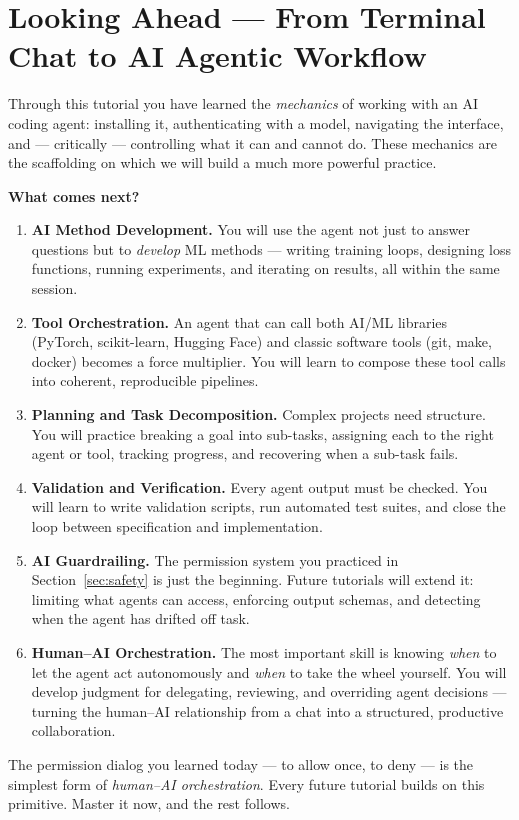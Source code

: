 \documentclass[11pt]{article}
\newcommand{\key}[1]{\keystroke{#1}}
\newcommand{\keystroke}[1]{%
  \tikz[baseline=(key.base)]{%
    \node[draw, rounded corners=2pt, inner sep=2pt, fill=gray!10,
          font=\ttfamily\small] (key) {#1};%
  }%
}
\begin{document}
\section{Looking Ahead --- From Terminal Chat to AI Agentic Workflow}
\label{sec:outlook}

\begin{def-box}
Through this tutorial you have learned the \emph{mechanics} of working with an AI coding agent: installing it, authenticating with a model, navigating the interface, and --- critically --- controlling what it can and cannot do.  These mechanics are the scaffolding on which we will build a much more powerful practice.

\medskip
\noindent\textbf{What comes next?}

\begin{enumerate}[nosep]
  \item \textbf{AI Method Development.}  You will use the agent not just to answer questions but to \emph{develop} ML methods --- writing training loops, designing loss functions, running experiments, and iterating on results, all within the same session.
  \item \textbf{Tool Orchestration.}  An agent that can call both AI/ML libraries (PyTorch, scikit-learn, Hugging Face) and classic software tools (git, make, docker) becomes a force multiplier.  You will learn to compose these tool calls into coherent, reproducible pipelines.
  \item \textbf{Planning and Task Decomposition.}  Complex projects need structure.  You will practice breaking a goal into sub-tasks, assigning each to the right agent or tool, tracking progress, and recovering when a sub-task fails.
  \item \textbf{Validation and Verification.}  Every agent output must be checked.  You will learn to write validation scripts, run automated test suites, and close the loop between specification and implementation.
  \item \textbf{AI Guardrailing.}  The permission system you practiced in Section~\ref{sec:safety} is just the beginning.  Future tutorials will extend it: limiting what agents can access, enforcing output schemas, and detecting when the agent has drifted off task.
  \item \textbf{Human--AI Orchestration.}  The most important skill is knowing \emph{when} to let the agent act autonomously and \emph{when} to take the wheel yourself.  You will develop judgment for delegating, reviewing, and overriding agent decisions --- turning the human--AI relationship from a chat into a structured, productive collaboration.
\end{enumerate}

\medskip
\noindent The permission dialog you learned today --- \key{a} to allow once, \key{d} to deny --- is the simplest form of \emph{human--AI orchestration}.  Every future tutorial builds on this primitive.  Master it now, and the rest follows.
\end{def-box}
\end{document}
